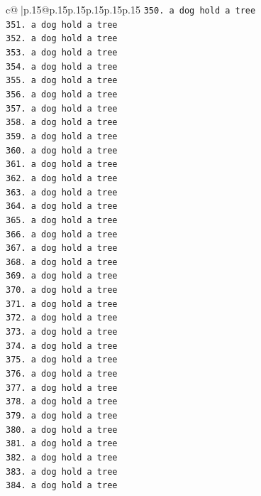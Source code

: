 \documentclass{article}
\begin{document}
{\begin{supertabular}{c@{$\;$}|p{.15\linewidth}@{}p{.15\linewidth}p{.15\linewidth}p{.15\linewidth}p{.15\linewidth}p{.15\linewidth}}
{{{\texttt{350. a dog hold a tree} \\
\texttt{351. a dog hold a tree} \\
\texttt{352. a dog hold a tree} \\
\texttt{353. a dog hold a tree} \\
\texttt{354. a dog hold a tree} \\
\texttt{355. a dog hold a tree} \\
\texttt{356. a dog hold a tree} \\
\texttt{357. a dog hold a tree} \\
\texttt{358. a dog hold a tree} \\
\texttt{359. a dog hold a tree} \\
\texttt{360. a dog hold a tree} \\
\texttt{361. a dog hold a tree} \\
\texttt{362. a dog hold a tree} \\
\texttt{363. a dog hold a tree} \\
\texttt{364. a dog hold a tree} \\
\texttt{365. a dog hold a tree} \\
\texttt{366. a dog hold a tree} \\
\texttt{367. a dog hold a tree} \\
\texttt{368. a dog hold a tree} \\
\texttt{369. a dog hold a tree} \\
\texttt{370. a dog hold a tree} \\
\texttt{371. a dog hold a tree} \\
\texttt{372. a dog hold a tree} \\
\texttt{373. a dog hold a tree} \\
\texttt{374. a dog hold a tree} \\
\texttt{375. a dog hold a tree} \\
\texttt{376. a dog hold a tree} \\
\texttt{377. a dog hold a tree} \\
\texttt{378. a dog hold a tree} \\
\texttt{379. a dog hold a tree} \\
\texttt{380. a dog hold a tree} \\
\texttt{381. a dog hold a tree} \\
\texttt{382. a dog hold a tree} \\
\texttt{383. a dog hold a tree} \\
\texttt{384. a dog hold a tree} \\
}}}
\end{supertabular}}
\end{document}
